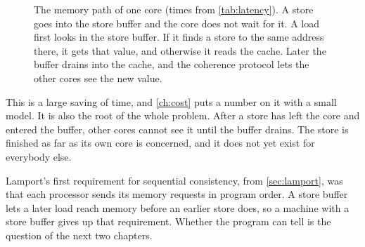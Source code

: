\begin{figure}[!htbp]
\centering
{}
\caption{The memory path of one core (times from \cref{tab:latency}). A store goes into the store buffer and the core does not wait for it. A load first looks in the store buffer. If it finds a store to the same address there, it gets that value, and otherwise it reads the cache. Later the buffer drains into the cache, and the coherence protocol lets the other cores see the new value.}
\label{fig:sbpath}
\end{figure}

This is a large saving of time, and \cref{ch:cost} puts a number on it with a small model. It is also the root of the whole problem. After a store has left the core and entered the buffer, other cores cannot see it until the buffer drains. The store is finished as far as its own core is concerned, and it does not yet exist for everybody else.

Lamport's first requirement for sequential consistency, from \cref{sec:lamport}, was that each processor sends its memory requests in program order\cite{lamport1979}. A store buffer lets a later load reach memory before an earlier store does, so a machine with a store buffer gives up that requirement. Whether the program can tell is the question of the next two chapters.

